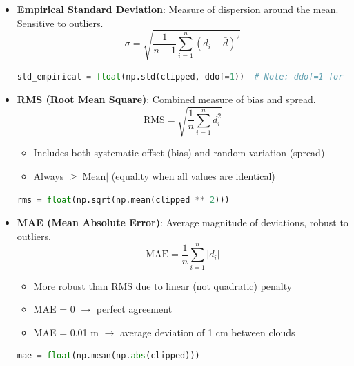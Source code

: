 \documentclass[12pt]{article}
\begin{document}
\begin{itemize}
    \item \textbf{Empirical Standard Deviation}: Measure of dispersion around the mean. Sensitive to outliers.
    \begin{equation}
        \sigma = \sqrt{\frac{1}{n-1} \sum_{i=1}^{n} (d_i - \bar{d})^2}
    \end{equation}
    \begin{lstlisting}[language=Python]
std_empirical = float(np.std(clipped, ddof=1))  # Note: ddof=1 for sample std
    \end{lstlisting}

    \item \textbf{RMS (Root Mean Square)}: Combined measure of bias and spread.
    \begin{equation}
        \text{RMS} = \sqrt{ \frac{1}{n} \sum_{i=1}^{n} d_i^2 }
    \end{equation}
    \begin{itemize}
        \item Includes both systematic offset (bias) and random variation (spread)
        \item Always $\geq |\text{Mean}|$ (equality when all values are identical)
    \end{itemize}
    \begin{lstlisting}[language=Python]
rms = float(np.sqrt(np.mean(clipped ** 2)))
    \end{lstlisting}

    \item \textbf{MAE (Mean Absolute Error)}: Average magnitude of deviations, robust to outliers.
    \begin{equation}
        \text{MAE} = \frac{1}{n} \sum_{i=1}^{n} |d_i|
    \end{equation}
    \begin{itemize}
        \item More robust than RMS due to linear (not quadratic) penalty
        \item MAE = 0 $\rightarrow$ perfect agreement
        \item MAE = 0.01 m $\rightarrow$ average deviation of 1 cm between clouds
    \end{itemize}
    \begin{lstlisting}[language=Python]
mae = float(np.mean(np.abs(clipped)))
    \end{lstlisting}


\end{itemize}
\end{document}
